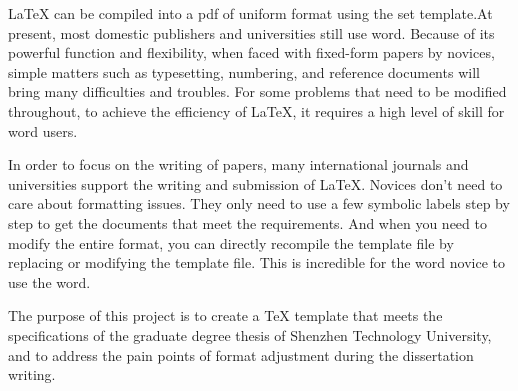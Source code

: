 

\begin{abstracten}
LaTeX can be compiled into a pdf of uniform format using the set template.At present, most domestic publishers and universities still use word. Because of its powerful function and flexibility, when faced with fixed-form papers by novices, simple matters such as typesetting, numbering, and reference documents will bring many difficulties and troubles. For some problems that need to be modified throughout, to achieve the efficiency of LaTeX, it requires a high level of skill for word users.

In order to focus on the writing of papers, many international journals and universities support the writing and submission of LaTeX. Novices don't need to care about formatting issues. They only need to use a few symbolic labels step by step to get the documents that meet the requirements. And when you need to modify the entire format, you can directly recompile the template file by replacing or modifying the template file. This is incredible for the word novice to use the word.

The purpose of this project is to create a TeX template that meets the specifications of the graduate degree thesis of Shenzhen Technology University, and to address the pain points of format adjustment during the dissertation writing.
\end{abstracten}